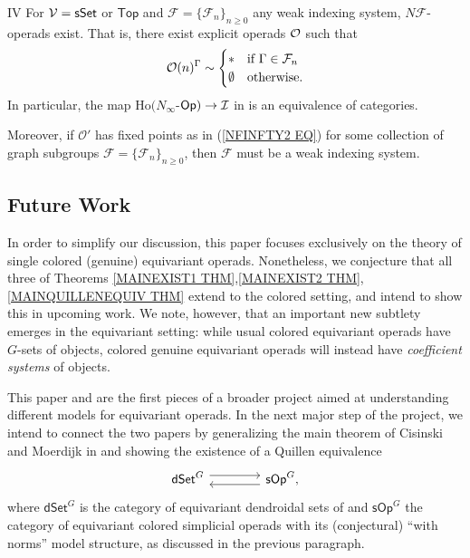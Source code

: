 \documentclass[a4paper,10pt]{article}%
\begin{document}
\begin{customcor}{IV}\label{NINFTY_REAL_COR_MAIN}
For $\mathcal V = \mathsf{sSet}$ or $\mathsf{Top}$ and 
$\mathcal{F} = \{\mathcal{F}_n\}_{n \geq 0}$
any weak indexing system,
$N \mathcal{F}$-operads exist. That is, there exist explicit operads $\mathcal{O}$
such that
\begin{equation}\label{NFINFTY2 EQ}
	\O(n)^{\Gamma} \sim 
\begin{cases}
	\** & \text{if } \Gamma \in \mathcal{F}_n
\\
	\emptyset & \text{otherwise}.
\end{cases}
\end{equation}  
In particular, the map $\mathrm{Ho}(N_\infty$-$\mathsf{Op}) \to \mathcal I$
in \cite[Cor. 5.6]{BH15}
 is an equivalence of categories.
 
 Moreover, if $\mathcal{O}'$ has fixed points as in 
 (\ref{NFINFTY2 EQ}) for some collection of graph subgroups 
 $\mathcal{F} = \{\mathcal{F}_n\}_{n \geq 0}$, then 
 $\mathcal{F}$ must be a weak indexing system.
\end{customcor}


\subsection{Future Work}

In order to simplify our discussion,
this paper focuses exclusively on the theory of 
single colored (genuine) equivariant operads.
Nonetheless, we conjecture that all three of 
Theorems \ref{MAINEXIST1 THM},\ref{MAINEXIST2 THM},\ref{MAINQUILLENEQUIV THM}
extend to the colored setting,
and intend to show this in upcoming work.
We note, however, that an important new subtlety emerges in the 
equivariant setting:
while usual colored equivariant operads have $G$-sets of objects,
colored genuine equivariant operads will instead have \textit{coefficient systems} of objects.

This paper and \cite{Pe17} are the first pieces of a broader project aimed at understanding different models for equivariant operads. 
In the next major step of the project, 
we intend to connect the two papers by
generalizing the main theorem of
Cisinski and Moerdijk in \cite{CM13b} and 
 showing the existence of a Quillen equivalence
\begin{equation}
\begin{tikzcd}[column sep =4em]
	\mathsf{dSet}^G \ar[shift left=1.5]{r} 
	&
	\mathsf{sOp}^G,
	\ar[shift left=1.5]{l}
\end{tikzcd}
\end{equation} 
where $\mathsf{dSet}^G$ is the
category of equivariant dendroidal sets of
\cite{Pe17} and 
$\mathsf{sOp}^G$ the category of equivariant colored simplicial operads with its (conjectural) ``with norms'' model structure,
as discussed in the previous paragraph.
\end{document}
